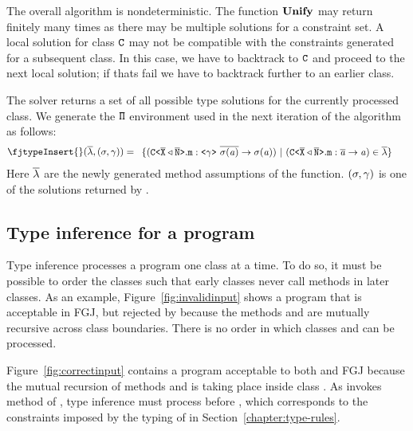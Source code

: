 \documentclass[a4paper,USenglish,cleveref, autoref, thm-restate]{lipics-v2021}
\begin{document}
The overall algorithm is nondeterministic. The function $\textbf{Unify}{}$ may
return finitely many times as there may be multiple solutions for a constraint
set.  A local solution for class ${\tt C}$ may not
be compatible with the constraints generated for a subsequent class. In this case, we have to backtrack to ${\tt C}$ and proceed to the next
local solution; if thats fail we have to backtrack further to an earlier class.


The solver \unify{} returns a set of all possible type solutions for the currently processed class.
We generate the ${\tt \Pi}$ environment used in the next iteration of the \fjtype{} algorithm as follows:
\begin{align*}
  \fjtypeInsert{}(\overline{\methodAssumption}, (\sigma, \unifyGenerics{})) & = \begin{array}{l}
    \set{(\exptype{C}{\ol{X} \triangleleft \ol{N}}.\mv{m} : \exptype{}{\unifyGenerics{}}\ \ol{\sigma(\tv{a})} \to \sigma(\tv{a})) \ |\ (\exptype{C}{\ol{X} \triangleleft \ol{N}}.\mv{m} : \ol{\tv{a}} \to \tv{a}) \in \overline{\methodAssumption}}
  \end{array} 
\end{align*}
Here $\overline{\mathtt{\lambda}}$ are the newly generated method assumptions of the \fjtype{} function.
$(\sigma, \gamma{})$ is one of the solutions returned by \unify{}.
\fi

\subsection{Type inference for a program }
\label{sec:proc-mult-class}

{Type inference processes a program one class at a time.
To do so, it must be possible to order the classes such that early
classes never call methods in later classes.
As an example, Figure~\ref{fig:invalidinput} shows a program that is
acceptable in FGJ, but rejected by \TFGJ because the methods 
and  are mutually recursive across class boundaries. There is
no order in which classes  and  can be processed.

Figure~\ref{fig:correctinput} contains a program
acceptable to both \TFGJ and FGJ because the mutual recursion of
methods  and  is taking place inside class . As
 invokes method  of , type inference must process
 before , which corresponds to the constraints imposed
by the typing of \TFGJ in Section~\ref{chapter:type-rules}.}
\end{document}
